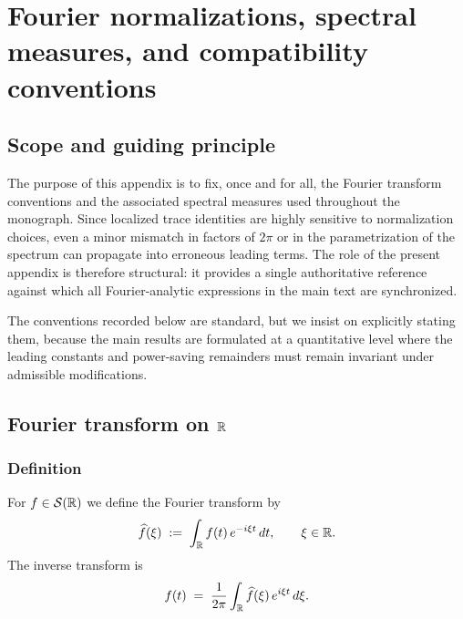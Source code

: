 
\appendix
\chapter{Fourier normalizations, spectral measures, and compatibility conventions}
\label{app:G.fourier}

\section{Scope and guiding principle}
\label{sec:G.scope}

The purpose of this appendix is to fix, once and for all, the Fourier transform conventions and the associated
spectral measures used throughout the monograph.  Since localized trace identities are highly sensitive to
normalization choices, even a minor mismatch in factors of $2\pi$ or in the parametrization of the spectrum can
propagate into erroneous leading terms.  The role of the present appendix is therefore structural: it provides a
single authoritative reference against which all Fourier-analytic expressions in the main text are synchronized.

The conventions recorded below are standard, but we insist on explicitly stating them, because the main results are
formulated at a quantitative level where the leading constants and power-saving remainders must remain invariant under
admissible modifications.

\section{Fourier transform on $\mathbb{R}$}
\label{sec:G.fourier.R}

\subsection{Definition}
\label{subsec:G.fourier.def}

For $f\in \mathcal{S}(\mathbb{R})$ we define the Fourier transform by
\begin{equation}\label{eq:G.fourier.def}
\widehat{f}(\xi)
\;:=\;
\int_{\mathbb{R}} f(t)\,e^{-i\xi t}\,dt,
\qquad
\xi\in\mathbb{R}.
\end{equation}
The inverse transform is
\begin{equation}\label{eq:G.fourier.inv}
f(t)
\;=\;
\frac{1}{2\pi}\int_{\mathbb{R}}\widehat{f}(\xi)\,e^{i\xi t}\,d\xi.
\end{equation}

